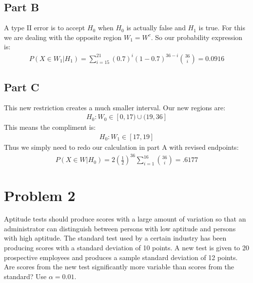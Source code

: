 \documentclass{article}
\begin{document}
\subsection*{Part B}
A type II error is to accept $H_0$ when $H_0$ is actually false and $H_1$ is true. For this we are dealing with the opposite region $W_1=W^c$. So our probability expression is:
\begin{align*}
\boxed{ P(X \in W_1 |H_1) =  \sum_{i=15}^{21} (0.7)^{i} (1-0.7)^{36-i} \binom{36}{i} = 0.0916 }
\end{align*}

\subsection*{Part C}
This new restriction creates a much smaller interval. Our new regions are:
\begin{align*}
H_0: W_0 \in [0,17) \cup (19,36]
\end{align*}
This means the compliment is:
\begin{align*}
H_0: W_1 \in [17,19]
\end{align*}
Thus we simply need to redo our calculation in part A with revised endpoints:
\begin{align*}
\boxed{ P(X \in W|H_0) = 2 (\frac{1}{2})^{36} \sum_{i=1}^{16} \binom{36}{i} = .6177 }
\end{align*}


\clearpage

\section*{Problem 2}
Aptitude tests should produce scores with a large amount of variation so that an administrator can distinguish between persons with low aptitude and persons with high aptitude. The standard test used by a certain industry has been producing scores with a standard deviation of 10 points. A new test is given to 20 prospective employees and produces a sample standard deviation of 12 points. Are scores from the new test significantly more variable than scores from the standard? Use $\alpha = 0.01$.
\end{document}
